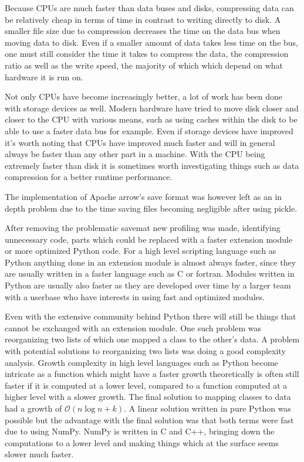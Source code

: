 \documentclass[12pt, a4paper]{article}
\begin{document}
Because CPUs are much faster than data buses and disks, compressing data can be relatively cheap in terms of time in contrast to writing directly to disk.
A smaller file size due to compression decreases the time on the data bus when moving data to disk.
Even if a smaller amount of data takes less time on the bus, one must still consider the time it takes to compress the data, the compression ratio as well as the write speed, the majority of which which depend on what hardware it is run on.

Not only CPUs have become increasingly better, a lot of work has been done with storage devices as well.
Modern hardware have tried to move disk closer and closer to the CPU with various means, such as using caches within the disk to be able to use a faster data bus for example.
Even if storage devices have improved it's worth noting that CPUs have improved much faster and will in general always be faster than any other part in a machine.
With the CPU being extremely faster than disk it is sometimes worth investigating things such as data compression for a better runtime performance.

The implementation of Apache arrow's save format was however left as an in depth problem due to the time saving files becoming negligible after using pickle.

After removing the problematic savemat new profiling was made, identifying unnecessary code, parts which could be replaced with a faster extension module or more optimized Python code.
For a high level scripting language such as Python anything done in an extension module is almost always faster, since they are usually written in a faster language such as C or fortran.
Modules written in Python are usually also faster as they are developed over time by a larger team with a userbase who have interests in using fast and optimized modules.

Even with the extensive community behind Python there will still be things that cannot be exchanged with an extension module.
One such problem was reorganizing two lists of which one mapped a class to the other's data.
A problem with potential solutions to reorganizing two lists was doing a good complexity analysis.
Growth complexity in high level languages such as Python become intricate as a function which might have a faster growth theoretically is often still faster if it is computed at a lower level, compared to a function computed at a higher level with a slower growth.
The final solution to mapping classes to data had a growth of $\mathcal{O}(n\log n + k)$.
A linear solution written in pure Python was possible but the advantage with the final solution was that both terms were fast due to using NumPy.
NumPy is written in C and C++, bringing down the computations to a lower level and making things which at the surface seems slower much faster.

\end{document}
